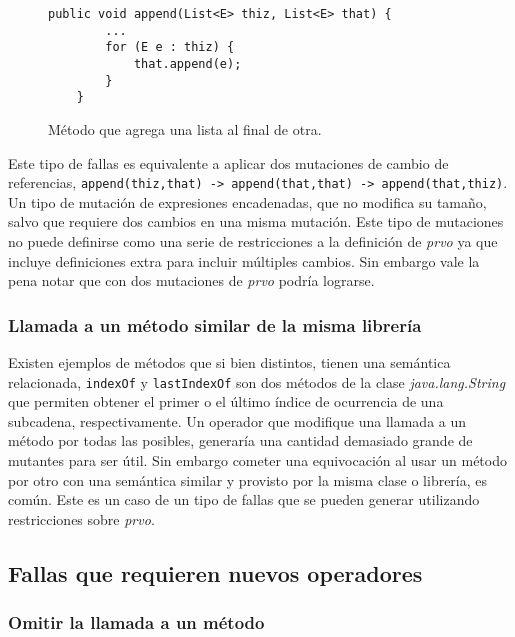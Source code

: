 \begin{figure}
	\begin{lstlisting}[frame=single, mathescape=true,framexleftmargin=1.5em]
	public void append(List<E> thiz, List<E> that) {
		...
		for (E e : thiz) {
			that.append(e);
		}
	}
	\end{lstlisting}
	\caption{M\'etodo que agrega una lista al final de otra.}
	\label{figures.examples.argumentSwap.example1}
\end{figure}

Este tipo de fallas es equivalente a aplicar dos mutaciones de cambio de referencias, \lstinline|append(thiz,that) -> append(that,that) -> append(that,thiz)|. Un tipo de mutaci\'on de expresiones encadenadas, que no modifica su tama\~no, salvo que requiere dos cambios en una misma mutaci\'on. Este tipo de mutaciones no puede definirse como una serie de restricciones a la definici\'on de \emph{prvo} ya que incluye definiciones extra para incluir m\'ultiples cambios. Sin embargo vale la pena notar que con dos mutaciones de \emph{prvo} podr\'ia lograrse.

\subsubsection{Llamada a un m\'etodo similar de la misma librer\'ia}

Existen ejemplos de m\'etodos que si bien distintos, tienen una sem\'antica relacionada, \texttt{indexOf} y \texttt{lastIndexOf} son dos m\'etodos de la clase \emph{java.lang.String} que permiten obtener el primer o el \'ultimo \'indice de ocurrencia de una subcadena, respectivamente. Un operador que modifique una llamada a un m\'etodo por todas las posibles, generar\'ia una cantidad demasiado grande de mutantes para ser \'util. Sin embargo cometer una equivocaci\'on al usar un m\'etodo por otro con una sem\'antica similar y provisto por la misma clase o librer\'ia, es com\'un. Este es un caso de un tipo de fallas que se pueden generar utilizando restricciones sobre \emph{prvo}.

\subsection{Fallas que requieren nuevos operadores}

\subsubsection{Omitir la llamada a un m\'etodo}

